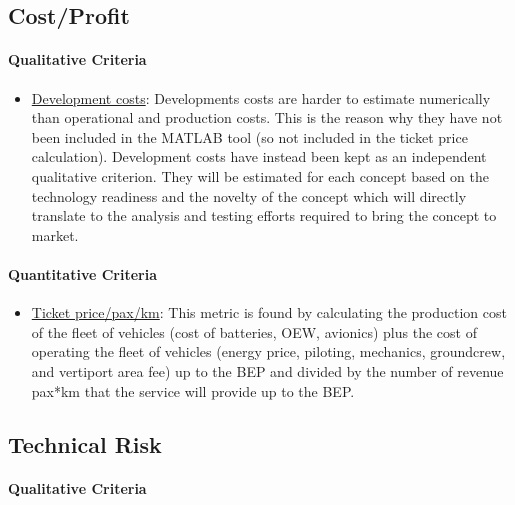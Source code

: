 \subsection{Cost/Profit}

\paragraph{Qualitative Criteria}


\begin{itemize}[nolistsep]
    \item \underline{Development costs}: Developments costs are harder to estimate numerically than operational and production costs. This is the reason why they have not been included in the MATLAB tool (so not included in the ticket price calculation). Development costs have instead been kept as an independent qualitative criterion. They will be estimated for each concept based on the technology readiness and the novelty of the concept which will directly translate to the analysis and testing efforts required to bring the concept to market.
\end{itemize}

\paragraph{Quantitative Criteria}



\begin{itemize}[nolistsep]
   \item \underline{Ticket price/pax/km}: This metric is found by calculating the production cost of the fleet of vehicles (cost of batteries, OEW, avionics) plus the cost of operating the fleet of vehicles (energy price, piloting, mechanics, groundcrew, and vertiport area fee) up to the BEP and divided by the number of revenue pax*km that the service will provide up to the BEP. 
\end{itemize}

\subsection{Technical Risk}

\paragraph{Qualitative Criteria}

